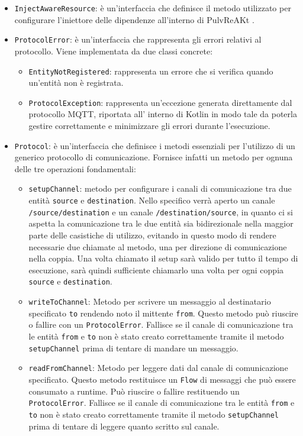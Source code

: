 \documentclass[12pt,a4paper,openright,twoside]{book}
\begin{document}
\begin{itemize}
    \item \texttt{InjectAwareResource}: è un'interfaccia che definisce il metodo utilizzato per configurare l'iniettore delle dipendenze all'interno di PulvReAKt .

    \item \texttt{ProtocolError}: è un'interfaccia che rappresenta gli errori relativi al protocollo. Viene implementata da due classi concrete:
    \begin{itemize}
        \item \texttt{EntityNotRegistered}: rappresenta un errore che si verifica quando un'entità non è registrata.
        \item \texttt{ProtocolException}: rappresenta un'eccezione generata direttamente dal protocollo \ac{MQTT}, riportata all' interno di Kotlin 
        in modo tale da poterla gestire correttamente e minimizzare gli errori durante l'esecuzione.
    \end{itemize}

    \item \texttt{Protocol}: è un'interfaccia che definisce i metodi essenziali per l'utilizzo di un generico protocollo di comunicazione. 
    Fornisce infatti un metodo per ognuna delle tre operazioni fondamentali:
    \begin{itemize}
        \item \texttt{setupChannel}: metodo per configurare i canali di comunicazione tra due entità \texttt{source} e \texttt{destination}. 
        Nello specifico verrà aperto un canale \texttt{/source/destination} e un canale \texttt{/destination/source}, 
        in quanto ci si aspetta la comunicazione tra le due entità sia bidirezionale nella maggior parte delle casistiche di utilizzo, 
        evitando in questo modo di rendere necessarie due chiamate al metodo, una per direzione di comunicazione nella coppia.
        Una volta chiamato il setup sarà valido per tutto il tempo di esecuzione, sarà quindi sufficiente chiamarlo una volta per ogni coppia 
        \texttt{source} e \texttt{destination}.
        \item \texttt{writeToChannel}: Metodo per scrivere un messaggio al destinatario specificato \texttt{to} rendendo noto il mittente \texttt{from}. 
        Questo metodo può riuscire o fallire con un \texttt{ProtocolError}. Fallisce se il canale di comunicazione tra le entità \texttt{from} e \texttt{to}
        non è stato creato correttamente tramite il metodo \texttt{setupChannel} prima di tentare di mandare un messaggio.
        \item \texttt{readFromChannel}: Metodo per leggere dati dal canale di comunicazione specificato. Questo metodo restituisce un \texttt{Flow} 
        di messaggi che può essere consumato a runtime. Può riuscire o fallire restituendo un \texttt{ProtocolError}. 
        Fallisce se il canale di comunicazione tra le entità \texttt{from} e \texttt{to}
        non è stato creato correttamente tramite il metodo \texttt{setupChannel} prima di tentare di leggere quanto scritto sul canale.
    \end{itemize}


\end{itemize}
\end{document}
